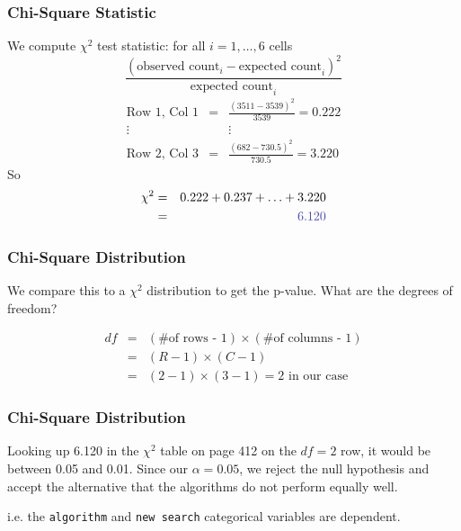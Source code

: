 \documentclass[handout]{beamer}
\newcommand{\blue}[1]{\textcolor{blue2}{#1}}
\begin{document}
\begin{frame}
\frametitle{Chi-Square Statistic}
We compute $\chi^2$ test statistic: for all $i = 1, \ldots, 6$ cells
\[
\frac{(\mbox{observed count}_i - \mbox{expected count}_i)^2}{\mbox{expected count}_i}
\]
\pause
\begin{eqnarray*}
\mbox{Row 1, Col 1} &=& \frac{(3511-3539)^2}{3539} = 0.222 \\
\vdots && \vdots\\
\mbox{Row 2, Col 3} &=& \frac{(682-730.5)^2}{730.5} = 3.220
\end{eqnarray*}
\pause So
\begin{eqnarray*}
\chi^2 &=& 0.222 + 0.237 + \ldots + 3.220\\
&=& \blue{6.120}
\end{eqnarray*}

\end{frame}


\begin{frame}
\frametitle{Chi-Square Distribution}
We compare this to a $\chi^2$ distribution to get the p-value.  What are the degrees of freedom?

\pause \begin{eqnarray*}
df &=& (\mbox{\# of rows - 1}) \times (\mbox{\# of columns - 1})\\
&=& (R-1) \times (C-1)\\
&=& (2-1) \times (3-1) = 2 \mbox{ in our case}
\end{eqnarray*}

\end{frame}


\begin{frame}
\frametitle{Chi-Square Distribution}
Looking up 6.120 in the $\chi^2$ table on page 412 on the $df=2$ row, it would be between 0.05 and 0.01.  Since our $\alpha=0.05$, we reject the null hypothesis and accept the alternative that the algorithms do not perform equally well.  

\vspace{0.5cm}

i.e. the {\tt algorithm} and {\tt new search} categorical variables are dependent.

\end{frame}
\end{document}
